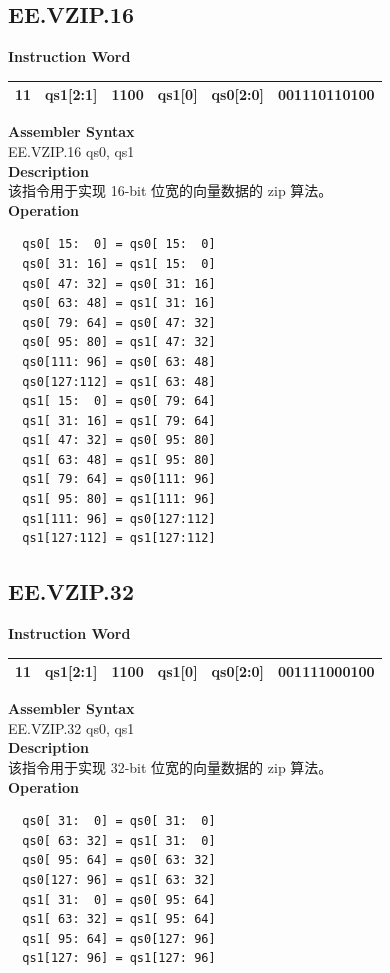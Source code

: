 \clearpage
\subsection{EE.VZIP.16}\label{instruction:EEVZIP16}
\setlength\tabcolsep{6pt}
\textbf{Instruction Word} \\
\begin{tabular}{|c|c|c|c|c|c|}
	\hline
	11 & qs1[2:1] & 1100 & qs1[0] & qs0[2:0] & 001110110100 \\
	\hline
\end{tabular}

\textbf{Assembler Syntax} \\
EE.VZIP.16 qs0, qs1 \\
\textbf{Description} \\
该指令用于实现 16-bit 位宽的向量数据的 zip 算法。\\
\textbf{Operation}
\begin{lstlisting}
  qs0[ 15:  0] = qs0[ 15:  0]
  qs0[ 31: 16] = qs1[ 15:  0]
  qs0[ 47: 32] = qs0[ 31: 16]
  qs0[ 63: 48] = qs1[ 31: 16]
  qs0[ 79: 64] = qs0[ 47: 32]
  qs0[ 95: 80] = qs1[ 47: 32]
  qs0[111: 96] = qs0[ 63: 48]
  qs0[127:112] = qs1[ 63: 48]
  qs1[ 15:  0] = qs0[ 79: 64]
  qs1[ 31: 16] = qs1[ 79: 64]
  qs1[ 47: 32] = qs0[ 95: 80]
  qs1[ 63: 48] = qs1[ 95: 80]
  qs1[ 79: 64] = qs0[111: 96]
  qs1[ 95: 80] = qs1[111: 96]
  qs1[111: 96] = qs0[127:112]
  qs1[127:112] = qs1[127:112]
\end{lstlisting}

\clearpage
\subsection{EE.VZIP.32}\label{instruction:EEVZIP32}
\setlength\tabcolsep{6pt}
\textbf{Instruction Word} \\
\begin{tabular}{|c|c|c|c|c|c|}
	\hline
	11 & qs1[2:1] & 1100 & qs1[0] & qs0[2:0] & 001111000100 \\
	\hline
\end{tabular}

\textbf{Assembler Syntax} \\
EE.VZIP.32 qs0, qs1 \\
\textbf{Description} \\
该指令用于实现 32-bit 位宽的向量数据的 zip 算法。\\
\textbf{Operation}
\begin{lstlisting}
  qs0[ 31:  0] = qs0[ 31:  0]
  qs0[ 63: 32] = qs1[ 31:  0]
  qs0[ 95: 64] = qs0[ 63: 32]
  qs0[127: 96] = qs1[ 63: 32]
  qs1[ 31:  0] = qs0[ 95: 64]
  qs1[ 63: 32] = qs1[ 95: 64]
  qs1[ 95: 64] = qs0[127: 96]
  qs1[127: 96] = qs1[127: 96]
\end{lstlisting}

